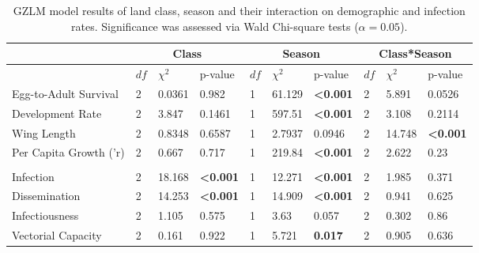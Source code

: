 \documentclass[doublespacing, linenumbers]{bmcart}
\begin{document}
\begin{backmatter}
\begin{table}[h!]
\caption{GZLM model results of land class, season and their interaction on demographic and infection rates. Significance was assessed via Wald Chi-square tests ($\alpha=0.05$).}
      \begin{tabular}{|l|lll|lll|lll|}
      \hline
                       & \multicolumn{3}{c|}{\textbf{Class}}    & \multicolumn{3}{c|}{\textbf{Season}}   & \multicolumn{3}{c|}{\textbf{Class*Season}} \\  \hline
                       & $df$ & $\chi^2$  & p-value                 & $df$ & $\chi^2$  & p-value                 & $df$   & $\chi^2$   & p-value                  \\ \hline
Egg-to-Adult Survival               & 2  & 0.0361 & 0.982                   & 1  & 61.129 & \textbf{\textless0.001} & 2    & 5.891   & 0.0526                   \\
Development Rate       & 2  & 3.847  & 0.1461                  & 1  & 597.51 & \textbf{\textless0.001} & 2    & 3.108   & 0.2114                   \\
Wing Length            & 2  & 0.8348 & 0.6587                  & 1  & 2.7937 & 0.0946                  & 2    & 14.748  & \textbf{\textless0.001}  \\
Per Capita Growth ('r) & 2  & 0.667  & 0.717                   & 1  & 219.84 & \textbf{\textless0.001} & 2    & 2.622   & 0.23                     \\
                       &    &        &                         &    &        &                         &      &         &                          \\
Infection              & 2  & 18.168 & \textbf{\textless0.001} & 1  & 12.271 & \textbf{\textless0.001} & 2    & 1.985   & 0.371                    \\
Dissemination          & 2  & 14.253 & \textbf{\textless0.001} & 1  & 14.909 & \textbf{\textless0.001} & 2    & 0.941   & 0.625                    \\
Infectiousness         & 2  & 1.105  & 0.575                   & 1  & 3.63   & 0.057                   & 2    & 0.302   & 0.86                     \\
Vectorial Capacity     & 2  & 0.161  & 0.922                   & 1  & 5.721  & \textbf{0.017}          & 2    & 0.905   & 0.636 \\ \hline
\end{tabular}
  \label{table:modelResults}
\end{table}


\end{backmatter}
\end{document}
